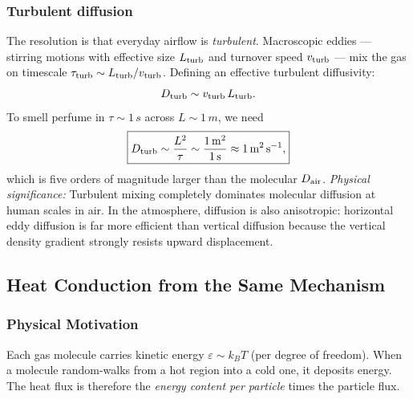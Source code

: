 \subsubsection*{Turbulent diffusion}
The resolution is that everyday airflow is \emph{turbulent}. Macroscopic
eddies — stirring motions with effective size $L_{\rm turb}$ and turnover
speed $v_{\rm turb}$ — mix the gas on timescale $\tau_{\rm turb} \sim
L_{\rm turb}/v_{\rm turb}$. Defining an effective turbulent diffusivity:
\begin{equation}
    D_{\rm turb} \sim v_{\rm turb}\,L_{\rm turb} .
    \label{eq:lec06:Dturb}
\end{equation}
To smell perfume in $\tau \sim 1\,\si{s}$ across $L \sim 1\,\si{m}$, we need
\begin{equation}
    \boxed{
    D_{\rm turb} \sim \frac{L^2}{\tau} \sim \frac{1\,\si{m^2}}{1\,\si{s}}
    \approx 1\,\si{m^2\,s^{-1}} ,
    }
    \label{eq:lec06:Dturb-estimate}
\end{equation}
which is five orders of magnitude larger than the molecular $D_{\rm air}$.
\textit{Physical significance:} Turbulent mixing completely dominates
molecular diffusion at human scales in air. In the atmosphere, diffusion is
also anisotropic: horizontal eddy diffusion is far more efficient than
vertical diffusion because the vertical density gradient strongly resists
upward displacement.

\subsection{Heat Conduction from the Same Mechanism}
\label{sec:lec06:heat-conduction}

\subsubsection*{Physical Motivation}
Each gas molecule carries kinetic energy $\varepsilon \sim k_B T$ (per degree
of freedom). When a molecule random-walks from a hot region into a cold one,
it deposits energy. The heat flux is therefore the \emph{energy content per
particle} times the particle flux.

